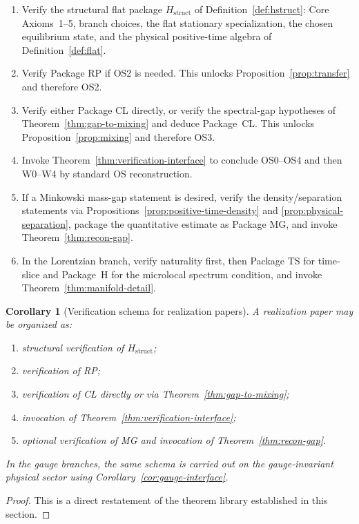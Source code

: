 \documentclass[12pt,a4paper]{article}
\theoremstyle{plain}
\newtheorem{corollary}[theorem]{Corollary}
\theoremstyle{definition}
\theoremstyle{remark}
\begin{document}
\begin{enumerate}
\item Verify the structural flat package $H_{\mathrm{struct}}$ of
  Definition~\ref{def:hstruct}: Core Axioms~1--5, branch choices, the
  flat stationary specialization, the chosen equilibrium state, and
  the physical positive-time algebra of Definition~\ref{def:flat}.
\item Verify Package RP if OS2 is needed. This unlocks
  Proposition~\ref{prop:transfer} and therefore OS2.
\item Verify either Package CL directly, or verify the spectral-gap
  hypotheses of Theorem~\ref{thm:gap-to-mixing} and deduce
  Package~CL. This unlocks Proposition~\ref{prop:mixing} and therefore
  OS3.
\item Invoke Theorem~\ref{thm:verification-interface} to conclude
  OS0--OS4 and then W0--W4 by standard OS reconstruction.
\item If a Minkowski mass-gap statement is desired, verify the
  density/separation statements via
  Propositions~\ref{prop:positive-time-density} and
  \ref{prop:physical-separation}, package the quantitative estimate as
  Package MG, and invoke Theorem~\ref{thm:recon-gap}.
\item In the Lorentzian branch, verify naturality first, then Package
  TS for time-slice and Package~H for the microlocal spectrum
  condition, and invoke Theorem~\ref{thm:manifold-detail}.
\end{enumerate}

\begin{corollary}[Verification schema for realization papers]
  A realization paper may be organized as:
  \begin{enumerate}[nosep,label=(\roman*)]
  \item structural verification of $H_{\mathrm{struct}}$;
  \item verification of RP;
  \item verification of CL directly or via
    Theorem~\ref{thm:gap-to-mixing};
  \item invocation of
    Theorem~\ref{thm:verification-interface};
  \item optional verification of MG and invocation of
    Theorem~\ref{thm:recon-gap}.
  \end{enumerate}
  In the gauge branches, the same schema is carried out on the
  gauge-invariant physical sector using
  Corollary~\ref{cor:gauge-interface}.
\end{corollary}
\begin{proof}
  This is a direct restatement of the theorem library established in
  this section.
\end{proof}
\end{document}
